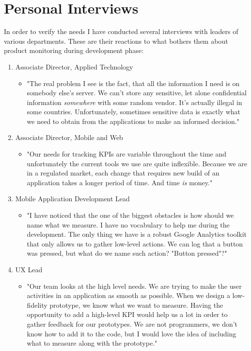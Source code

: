 \section{Personal Interviews}

In order to verify the needs I have conducted several interviews with leaders of various departments. These are their reactions to what bothers them about product monitoring during development phase:

\begin{enumerate}
		\item Associate Director, Applied Technology
		\begin{itemize}
				\item[] "The real problem I see is the fact, that all the information I need is on somebody else's server. We can't store any sensitive, let alone confidential information \emph{somewhere} with some random vendor. It's actually illegal in some countries. Unfortunately, sometimes sensitive data is exactly what we need to obtain from the applications to make an informed decision."
		\end{itemize}	

		\item Associate Director, Mobile and Web
		\begin{itemize}
				\item[] "Our needs for tracking KPIs are variable throughout the time and unfortunately the current tools we use are quite inflexible. Because we are in a regulated market, each change that requires new build of an application takes a longer period of time. And time \emph{is} money."
		\end{itemize}				
		
		\item Mobile Application Development Lead
		\begin{itemize}
				\item[] "I have noticed that the one of the biggest obstacles is how should we name what we measure. I have no vocabulary to help me during the development. The only thing we have is a robust Google Analytics toolkit that only allows us to gather low-level actions. We can log that a button was pressed, but what do we name such action? "Button pressed"?"
		\end{itemize}
		
		\item UX Lead
		\begin{itemize}
				\item[] "Our team looks at the high level needs. We are trying to make the user activities in an application as smooth as possible. When we design a low-fidelity prototype, we know what we want to measure. Having the opportunity to add a high-level KPI would help us a lot in order to gather feedback for our prototypes. We are not programmers, we don't know how to add it to the code, but I would love the idea of including what to measure along with the prototype."
		\end{itemize}
\end{enumerate}

